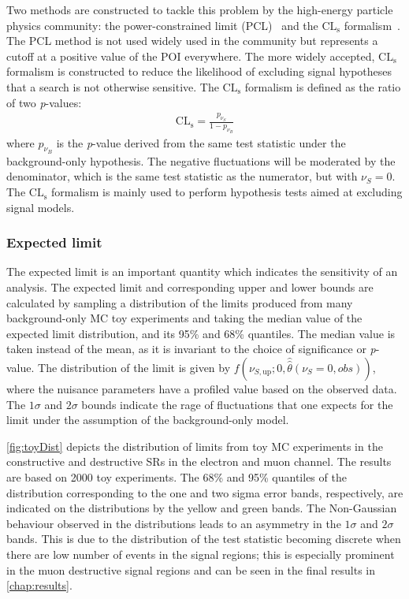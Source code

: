Two methods are constructed to tackle this problem by the high-energy particle physics community: the power-constrained limit (PCL)~\cite{PhysRevLett.122.231801} and the $\mathrm{CL}_\mathrm{s}$ formalism~\cite{JUNK1999435,Read_2002}. The PCL method is not used widely used in the community but represents a cutoff at a positive value of the POI everywhere. The more widely accepted, $\mathrm{CL}_\mathrm{s}$ formalism is constructed to reduce the likelihood of excluding signal hypotheses that a search is not otherwise sensitive. The $\mathrm{CL}_\mathrm{s}$ formalism is defined as the ratio of two \emph{p}-values:
\begin{equation}
    \label{eq:cls}
    \begin{aligned}
        \mathrm{CL}_\mathrm{s} = \frac{p_{\nu_{S}}}{1-p_{\nu_{B}}}
    \end{aligned}
\end{equation}
where $p_{\nu_{B}}$ is the \emph{p}-value derived from the same test statistic under the background-only hypothesis. The negative fluctuations will be moderated by the denominator, which is the same test statistic as the numerator, but with $\nu_S = 0$. The $\mathrm{CL}_\mathrm{s}$ formalism is mainly used to perform hypothesis tests aimed at excluding signal models. 

\subsubsection{Expected limit}
The expected limit is an important quantity which indicates the sensitivity of an analysis. The expected limit and corresponding upper and lower bounds are calculated by sampling a distribution of the limits produced from many background-only MC toy experiments and taking the median value of the expected limit distribution, and its 95\% and 68\% quantiles. The median value is taken instead of the mean, as it is invariant to the choice of significance or \emph{p}-value. The distribution of the limit is given by $f(\nu_{S,\mathrm{up}};0,\hat{\hat{\theta}}(\nu_S = 0,obs))$, where the nuisance parameters have a profiled value based on the observed data. The $1\sigma$ and $2\sigma$ bounds indicate the rage of fluctuations that one expects for the limit under the assumption of the background-only model. 

\cref{fig:toyDist} depicts the distribution of limits from toy MC experiments in the constructive and destructive SRs in the electron and muon channel. The results are based on 2000 toy experiments. The 68\% and 95\% quantiles of the distribution corresponding to the one and two sigma error bands, respectively, are indicated on the distributions by the yellow and green bands. The Non-Gaussian behaviour observed in the distributions leads to an asymmetry in the $1\sigma$ and $2\sigma$ bands. This is due to the distribution of the test statistic becoming discrete when there are low number of events in the signal regions; this is especially prominent in the muon destructive signal regions and can be seen in the final results in \cref{chap:results}. 

